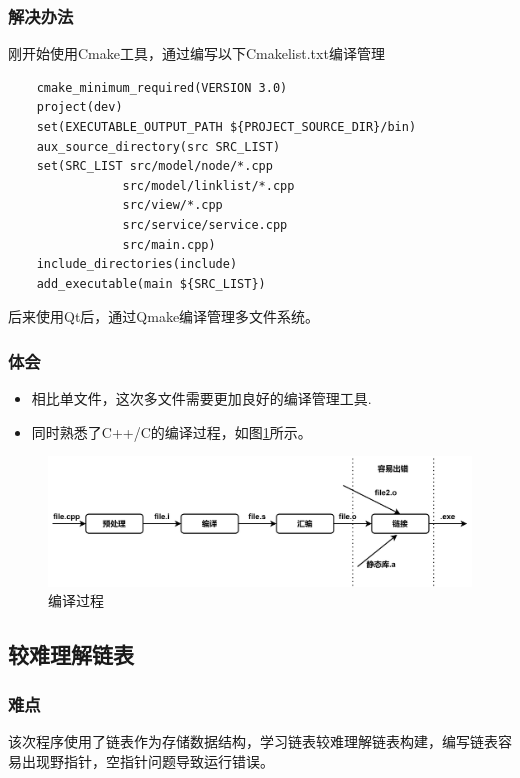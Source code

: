 \documentclass{article}
\begin{document}
    \subsubsection{解决办法}
    刚开始使用Cmake工具，通过编写以下Cmakelist.txt编译管理
    \begin{verbatim}
    cmake_minimum_required(VERSION 3.0)
    project(dev)
    set(EXECUTABLE_OUTPUT_PATH ${PROJECT_SOURCE_DIR}/bin)
    aux_source_directory(src SRC_LIST)
    set(SRC_LIST src/model/node/*.cpp 
                src/model/linklist/*.cpp
                src/view/*.cpp
                src/service/service.cpp
                src/main.cpp)
    include_directories(include)
    add_executable(main ${SRC_LIST})
    \end{verbatim}
    后来使用Qt后，通过Qmake编译管理多文件系统。
    \subsubsection{体会}
    \begin{itemize}
        \item 相比单文件，这次多文件需要更加良好的编译管理工具.
        \item  同时熟悉了C++/C的编译过程，如图\ref{cpp_complie}所示。
    \end{itemize}
    \begin{figure}[h]
        \centering
        \includegraphics[scale=0.08]{figure/cppcompile.png}
        \caption{编译过程}
        \label{cpp_complie}
    \end{figure}
    \subsection{较难理解链表}
    \subsubsection{难点}
    该次程序使用了链表作为存储数据结构，学习链表较难理解链表构建，编写链表容易出现野指针，空指针问题导致运行错误。
\end{document}
